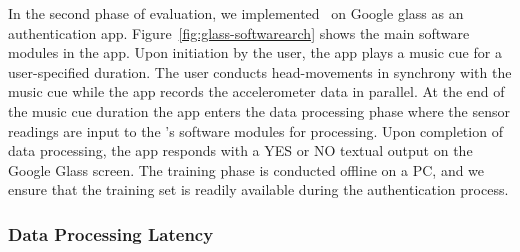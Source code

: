 In the second phase of evaluation, we implemented \systemname~on Google glass
as an authentication app.
Figure~\ref{fig:glass-softwarearch} shows the main software modules in the
app. Upon initiation by the user, the app plays a music cue for a user-specified
duration. The user conducts head-movements in synchrony with the music cue
while the app records the accelerometer data in parallel. At the end of the
music cue duration the app enters the data processing phase where the
sensor readings are input to the \systemname's software modules for
processing. %
Upon completion of data processing, the app responds with a YES or NO textual
output on the Google Glass screen. The training phase is conducted offline on a PC, and %
we ensure that the training set
is readily available during the authentication process. %

\subsubsection{Data Processing Latency}

